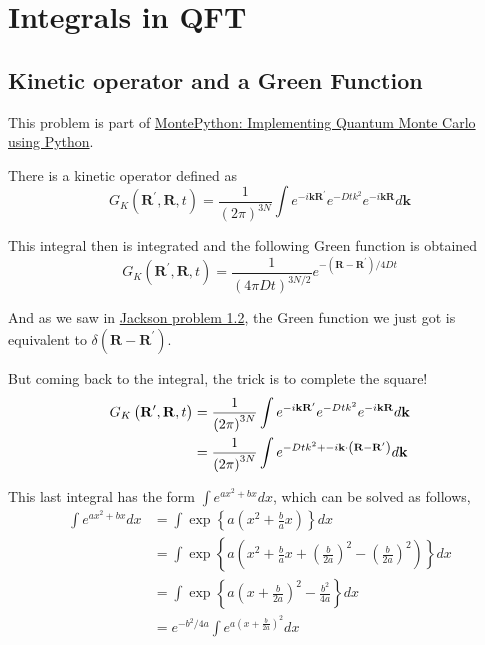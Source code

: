 \section{Integrals in QFT}

\subsection{Kinetic operator and a Green Function} \label{integral:kinetic-operator}

This problem is part of
\href{https://arxiv.org/abs/physics/0609191}{MontePython: Implementing Quantum Monte Carlo using Python}.

There is a kinetic operator defined as
$$
G_K \left(\mathbf{R}^\prime, \mathbf{R}, t\right) =
\frac{1}{\left(2\pi\right)^{3N}} \int e^{-i\mathbf{k}\mathbf{R}^\prime} e^{-Dtk^2} e^{-i\mathbf{k}\mathbf{R}} d\mathbf{k}
$$

This integral then is integrated and the following Green function is obtained
$$
G_K \left(\mathbf{R}^\prime, \mathbf{R}, t\right) =
\frac{1}{\left(4\pi Dt\right)^{3N/2}} e^{-\left(\mathbf{R}-\mathbf{R}^\prime\right) / 4Dt}
$$

And as we saw in \hyperref[jackson:problem-1.2]{Jackson problem 1.2}, the Green function we just got is equivalent to
$\delta\left(\mathbf{R} - \mathbf{R}^\prime\right)$.

But coming back to the integral, the trick is to complete the square!
\begin{align*}
G_K \left(\boldsymbol{\mathbf{R}}^\prime, \boldsymbol{\mathbf{R}}, t\right) &=
\frac{1}{\left(2\pi\right)^{3N}} \int e^{-i\boldsymbol{\mathbf{k}}\boldsymbol{\mathbf{R}}^\prime} e^{-Dtk^2} e^{-i\boldsymbol{\mathbf{k}}\boldsymbol{\mathbf{R}}} d\boldsymbol{\mathbf{k}} \\
&= \frac{1}{\left(2\pi\right)^{3N}} \int e^{-Dtk^2 + -i\boldsymbol{\mathbf{k}}\cdot\left(\boldsymbol{\mathbf{R}}-\boldsymbol{\mathbf{R}}^\prime\right)} d\mathbf{k}
\end{align*}

This last integral has the form $\int e^{ax^2 + bx} dx$, which can be solved as follows,
\begin{align*}
\int e^{ax^2 + bx} dx &= \int \exp\left\{ a\left(x^2 + \frac{b}{a}x\right) \right\} dx \\
&= \int \exp\left\{ a\left(x^2 + \frac{b}{a}x + \left(\frac{b}{2a}\right)^2 - \left(\frac{b}{2a}\right)^2 \right) \right\} dx \\
&= \int \exp\left\{ a\left(x + \frac{b}{2a}\right)^2 - \frac{b^2}{4a} \right\} dx \\
&= e^{-b^2/4a} \int e^{ a\left(x + \frac{b}{2a}\right)^2 } dx
\end{align*}

